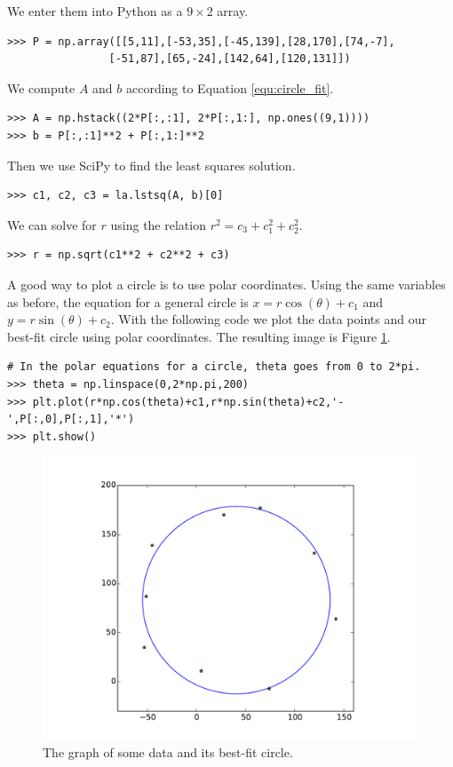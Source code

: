 We enter them into Python as a $9\times 2$ array.
\begin{lstlisting}
>>> P = np.array([[5,11],[-53,35],[-45,139],[28,170],[74,-7],
                [-51,87],[65,-24],[142,64],[120,131]])
\end{lstlisting}

We compute $A$ and $b$ according to Equation \ref{equ:circle_fit}.
\begin{lstlisting}
>>> A = np.hstack((2*P[:,:1], 2*P[:,1:], np.ones((9,1))))
>>> b = P[:,:1]**2 + P[:,1:]**2
\end{lstlisting}

Then we use SciPy to find the least squares solution.
\begin{lstlisting}
>>> c1, c2, c3 = la.lstsq(A, b)[0]
\end{lstlisting}

We can solve for $r$ using the relation $r^2 = c_3+c_1^2+c_2^2$.
\begin{lstlisting}
>>> r = np.sqrt(c1**2 + c2**2 + c3)
\end{lstlisting}

A good way to plot a circle is to use polar coordinates. 
Using the same variables as before, the equation for a general circle is $x=r\cos(\theta)+c_1$ and $y=r\sin(\theta)+c_2$. 
With the following code we plot the data points and our best-fit circle using polar coordinates. 
The resulting image is Figure \ref{fig:circle}.
\begin{lstlisting}
# In the polar equations for a circle, theta goes from 0 to 2*pi.
>>> theta = np.linspace(0,2*np.pi,200)
>>> plt.plot(r*np.cos(theta)+c1,r*np.sin(theta)+c2,'-',P[:,0],P[:,1],'*')
>>> plt.show()
\end{lstlisting}

\begin{figure}[H]
\includegraphics[width=\textwidth]{circle.pdf}
\caption{The graph of some data and its best-fit circle.}
\label{fig:circle}
\end{figure}

